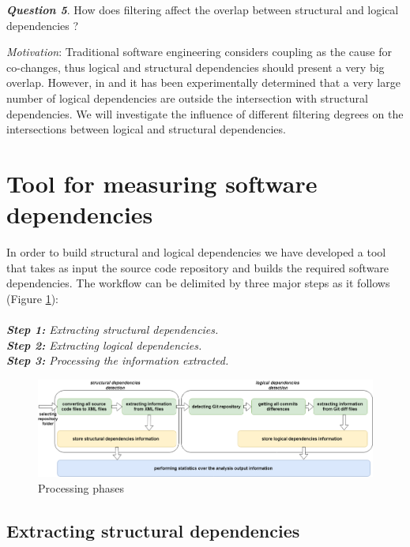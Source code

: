 \documentclass[a4paper,twoside]{article}
\begin{document}
\textit{\textbf{Question 5}}. How does filtering affect the overlap between structural and logical dependencies ? 

\textit{Motivation}: Traditional software engineering considers coupling as the cause for co-changes, thus logical and structural dependencies should present a very big overlap. However, in \cite{Oliva:2011:ISL:2067853.2068086} and \cite{DBLP:journals/jss/AjienkaC17} it has been experimentally determined that a very large number of logical dependencies are outside the intersection with structural dependencies. We will investigate the influence of different filtering degrees on the intersections between logical and structural dependencies.  





\section{Tool for measuring software dependencies}
\label{sec:tool}

In order to build structural and logical dependencies we have developed a tool that takes as input the source code repository and builds the required software dependencies. The workflow can be delimited by three major steps as it follows (Figure \ref{fig:fig3}):\\ \\
\textit{\textbf{Step 1:} Extracting structural dependencies.}\\
\textit{\textbf{Step 2:} Extracting logical dependencies.}\\
\textit{\textbf{Step 3:} Processing the information extracted.}



\begin{figure}[htb]
\centering
\includegraphics[width=\textwidth]{fig3.png}
\caption{Processing phases}
\label{fig:fig3}
\end{figure}

\subsection{ Extracting structural dependencies}
\end{document}
